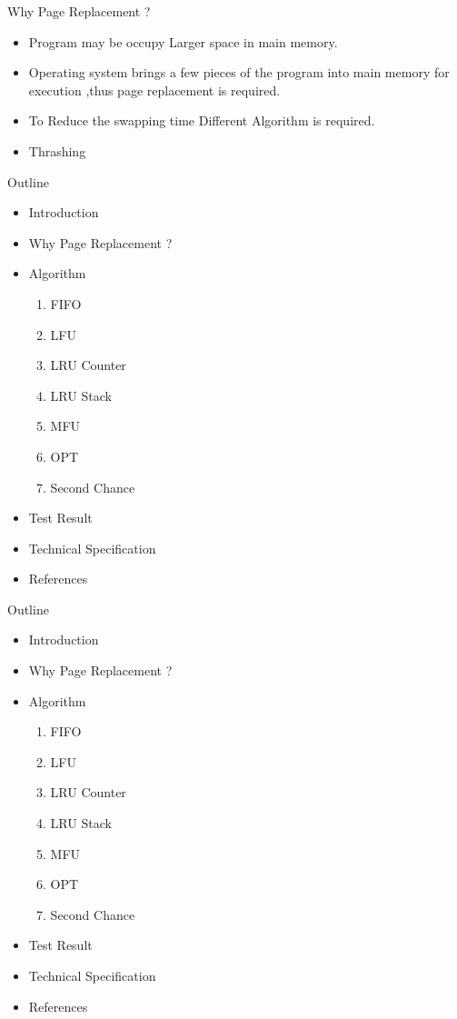 \documentclass{beamer}
\begin{document}
\begin{frame}{Why Page Replacement ?}
	\begin{itemize}
		\item Program may be occupy Larger space in main memory.
		\item Operating system brings a few pieces of the program into main memory for execution ,thus page replacement is required.
		\item To Reduce the swapping time Different Algorithm is required. 
		\item Thrashing
		
		
	\end{itemize}
\end{frame}
\begin{frame}{Outline}
	\begin{itemize}
		\item Introduction
		\item Why Page Replacement ?
		\item \alert{Algorithm}
		
		\begin{enumerate}
			\item FIFO
			\item LFU
			\item LRU Counter
			\item LRU Stack
			\item MFU
			\item OPT
			\item Second Chance
		\end{enumerate}
		\item Test Result
		\item Technical Specification
		\item References
		
		
	\end{itemize}
\end{frame}
\begin{frame}{Outline}
	\begin{itemize}
		\item Introduction
		\item Why Page Replacement ?
		\item Algorithm
		
		\begin{enumerate}
			\item \alert{FIFO}
			\item LFU
			\item LRU Counter
			\item LRU Stack
			\item MFU
			\item OPT
			\item Second Chance
		\end{enumerate}
		\item Test Result
		\item Technical Specification
		\item References
		
		
	\end{itemize}
\end{frame}
	
\end{document}
